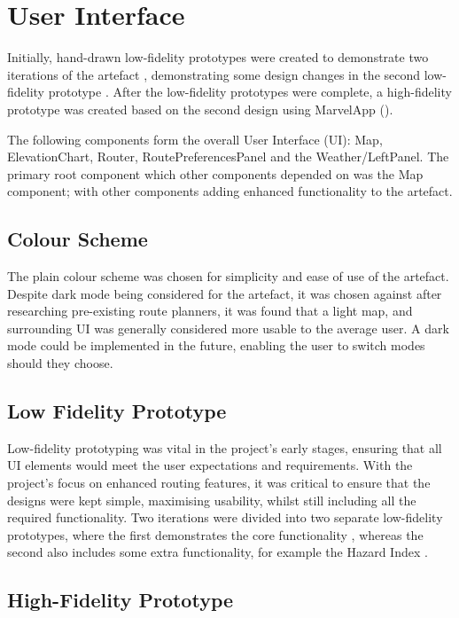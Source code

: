 \section{User Interface}
\label{design:ui}
Initially, hand-drawn low-fidelity prototypes were created to demonstrate two iterations of the artefact , demonstrating some design changes in the second low-fidelity prototype . After the low-fidelity prototypes were complete, a high-fidelity prototype was created based on the second design using MarvelApp (\cite{noauthor_marvel_nodate}).

The following components form the overall User Interface (UI): Map,  ElevationChart, Router, RoutePreferencesPanel and the Weather/LeftPanel. The primary root component which other components depended on was the Map component; with other components adding enhanced functionality to the artefact.

\subsection{Colour Scheme}
\label{ui:colourscheme}

The plain colour scheme was chosen for simplicity and ease of use of the artefact. Despite dark mode being considered for the artefact, it was chosen against after researching pre-existing route planners, it was found that a light map, and surrounding UI was generally considered more usable to the average user. A dark mode could be implemented in the future, enabling the user to switch modes should they choose.

\subsection{Low Fidelity Prototype}
\label{ui:low-fi}

Low-fidelity prototyping was vital in the project's early stages, ensuring that all UI elements would meet the user expectations and requirements. With the project's focus on enhanced routing features, it was critical to ensure that the designs were kept simple, maximising usability, whilst still including all the required functionality. Two iterations were divided into two separate low-fidelity prototypes, where the first demonstrates the core functionality , whereas the second also includes some extra functionality, for example the Hazard Index .

\subsection{High-Fidelity Prototype}
\label{ui:hi-fi}

